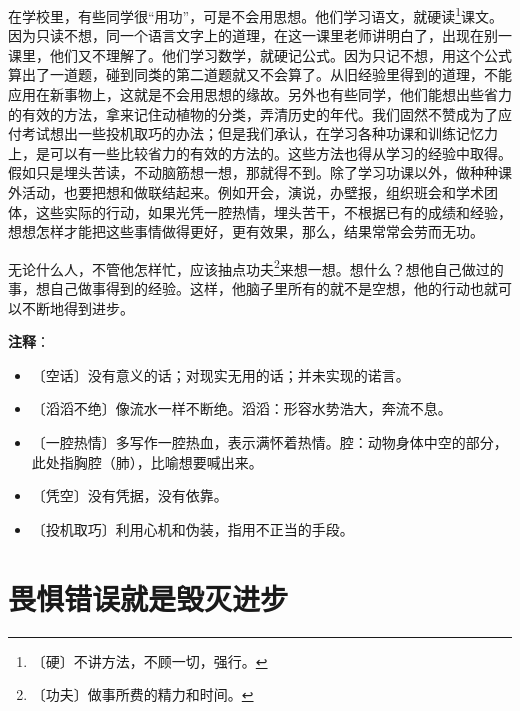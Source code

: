 \documentclass[12pt,UTF-8,openany]{ctexbook}
\begin{document}
\begin{normalsize}
    在学校里，有些同学很“用功”，可是不会用思想。他们学习语文，就硬读\footnote{〔硬〕不讲方法，不顾一切，强行。}课文。因为只读不想，同一个语言文字上的道理，在这一课里老师讲明白了，出现在别一课里，他们又不理解了。他们学习数学，就硬记公式。因为只记不想，用这个公式算出了一道题，碰到同类的第二道题就又不会算了。从旧经验里得到的道理，不能应用在新事物上，这就是不会用思想的缘故。另外也有些同学，他们能想出些省力的有效的方法，拿来记住动植物的分类，弄清历史的年代。我们固然不赞成为了应付考试想出一些投机取巧的办法；但是我们承认，在学习各种功课和训练记忆力上，是可以有一些比较省力的有效的方法的。这些方法也得从学习的经验中取得。假如只是埋头苦读，不动脑筋想一想，那就得不到。除了学习功课以外，做种种课外活动，也要把想和做联结起来。例如开会，演说，办壁报，组织班会和学术团体，这些实际的行动，如果光凭一腔热情，埋头苦干，不根据已有的成绩和经验，想想怎样才能把这些事情做得更好，更有效果，那么，结果常常会劳而无功。
    
    无论什么人，不管他怎样忙，应该抽点功夫\footnote{〔功夫〕做事所费的精力和时间。}来想一想。想什么？想他自己做过的事，想自己做事得到的经验。这样，他脑子里所有的就不是空想，他的行动也就可以不断地得到进步。
    
\end{normalsize}


\newpage

\textbf{注释}：

\vspace{-1em}

\begin{itemize}
    \setlength\itemsep{-0.2em}
    \item 〔空话〕没有意义的话；对现实无用的话；并未实现的诺言。
    \item 〔滔滔不绝〕像流水一样不断绝。滔滔：形容水势浩大，奔流不息。
    \item 〔一腔热情〕多写作一腔热血，表示满怀着热情。腔：动物身体中空的部分，此处指胸腔（肺），比喻想要喊出来。
    \item 〔凭空〕没有凭据，没有依靠。
    \item 〔投机取巧〕利用心机和伪装，指用不正当的手段。
\end{itemize}

\chapter{畏惧错误就是毁灭进步}
\end{document}
